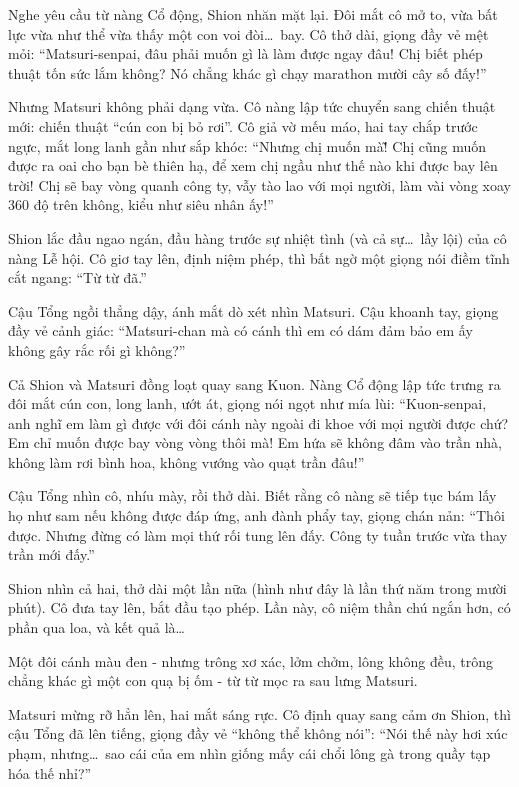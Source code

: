 \documentclass[../main.tex]{subfiles}
\begin{document}
Nghe yêu cầu từ nàng Cổ động, Shion nhăn mặt lại. Đôi mắt cô mở to, vừa bất lực vừa như thể vừa thấy một con voi đòi\dots\ bay. Cô thở dài, giọng đầy vẻ mệt mỏi: ``Matsuri-senpai, đâu phải muốn gì là làm được ngay đâu! Chị biết phép thuật tốn sức lắm không? Nó chẳng khác gì chạy marathon mười cây số đấy!''

Nhưng Matsuri không phải dạng vừa. Cô nàng lập tức chuyển sang chiến thuật mới: chiến thuật ``cún con bị bỏ rơi''. Cô giả vờ mếu máo, hai tay chắp trước ngực, mắt long lanh gần như sắp khóc: ``Nhưng chị muốn mà\~! Chị cũng muốn được ra oai cho bạn bè thiên hạ, để xem chị ngầu như thế nào khi được bay lên trời! Chị sẽ bay vòng quanh công ty, vẫy tào lao với mọi người, làm vài vòng xoay 360 độ trên không, kiểu như siêu nhân ấy!''

Shion lắc đầu ngao ngán, đầu hàng trước sự nhiệt tình (và cả sự\dots\ lầy lội) của cô nàng Lễ hội. Cô giơ tay lên, định niệm phép, thì bất ngờ một giọng nói điềm tĩnh cắt ngang: ``Từ từ đã.''

Cậu Tổng ngồi thẳng dậy, ánh mắt dò xét nhìn Matsuri. Cậu khoanh tay, giọng đầy vẻ cảnh giác: ``Matsuri-chan mà có cánh thì em có dám đảm bảo em ấy không gây rắc rối gì không?''

Cả Shion và Matsuri đồng loạt quay sang Kuon. Nàng Cổ động lập tức trưng ra đôi mắt cún con, long lanh, ướt át, giọng nói ngọt như mía lùi: ``Kuon-senpai, anh nghĩ em làm gì được với đôi cánh này ngoài đi khoe với mọi người được chứ? Em chỉ muốn được bay vòng vòng thôi mà! Em hứa sẽ không đâm vào trần nhà, không làm rơi bình hoa, không vướng vào quạt trần đâu!''

Cậu Tổng nhìn cô, nhíu mày, rồi thở dài. Biết rằng cô nàng sẽ tiếp tục bám lấy họ như sam nếu không được đáp ứng, anh đành phẩy tay, giọng chán nản: ``Thôi được. Nhưng đừng có làm mọi thứ rối tung lên đấy. Công ty tuần trước vừa thay trần mới đấy.''

Shion nhìn cả hai, thở dài một lần nữa (hình như đây là lần thứ năm trong mười phút). Cô đưa tay lên, bắt đầu tạo phép. Lần này, cô niệm thần chú ngắn hơn, có phần qua loa, và kết quả là…

Một đôi cánh màu đen - nhưng trông xơ xác, lởm chởm, lông không đều, trông chẳng khác gì một con quạ bị ốm - từ từ mọc ra sau lưng Matsuri.


Matsuri mừng rỡ hẳn lên, hai mắt sáng rực. Cô định quay sang cảm ơn Shion, thì cậu Tổng đã lên tiếng, giọng đầy vẻ ``không thể không nói'': ``Nói thế này hơi xúc phạm, nhưng\dots\ sao cái của em nhìn giống mấy cái chổi lông gà trong quầy tạp hóa thế nhỉ?''
\end{document}
